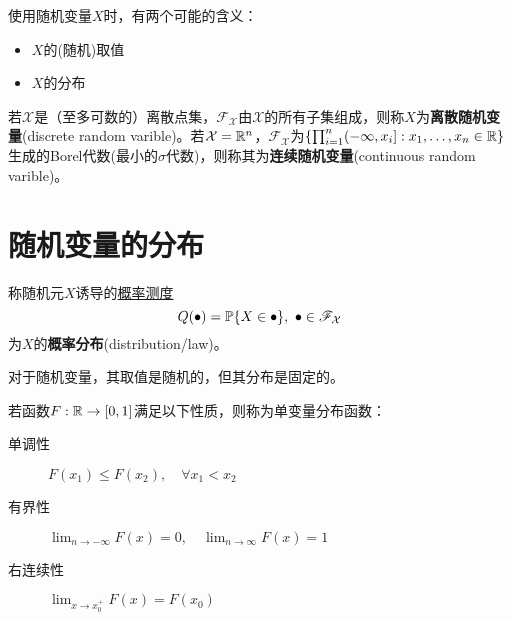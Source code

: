 \begin{remark}
    使用随机变量$X$时，有两个可能的含义：
    \begin{itemize}
        \item $X$的(随机)取值
        \item $X$的分布
    \end{itemize}
\end{remark}

\begin{definition}[离散与连续随机变量]
    若$\mathcal{X}$是（至多可数的）离散点集，$\mathscr{F}_{\mathcal{X}}$由$\mathcal{X}$的所有子集组成，则称$X$为\textbf{离散随机变量}(discrete random varible)。若$\mathcal{X} = \mathbb{R}^{n}$，$\mathscr{F}_{\mathcal{X}}$为$\{\prod_{i=1}^{n}(-\infty,x_{i}] : x_{1},\dots,x_{n}\in\mathbb{R}\}$生成的Borel代数(最小的$\sigma$代数)，则称其为\textbf{连续随机变量}(continuous random varible)。
\end{definition}

\section{随机变量的分布}

\begin{definition}[分布]
    称随机元$X$诱导的\underline{概率测度}
    \[ Q(\bullet)=\P\{X\in\bullet\},\ \bullet\in\mathscr{F}_{\mathcal{X}} \]
    为$X$的\textbf{概率分布}(distribution/law)。
\end{definition}
\begin{remark}
    对于随机变量，其取值是随机的，但其分布是固定的。
\end{remark}

\begin{definition}[分布函数]
    若函数$F : \mathbb{R} \to [0,1]$满足以下性质，则称为单变量分布函数：
    \begin{description}
        \item[单调性] $F(x_1)\le F(x_2) , \quad \forall x_1<x_2$
        \item[有界性] $\lim_{n \to -\infty}F(x)=0, \quad \lim_{n \to \infty}F(x)=1$
        \item[右连续性] $\lim_{x \to x_0^+}F(x)=F(x_0)$
    \end{description}
\end{definition}


